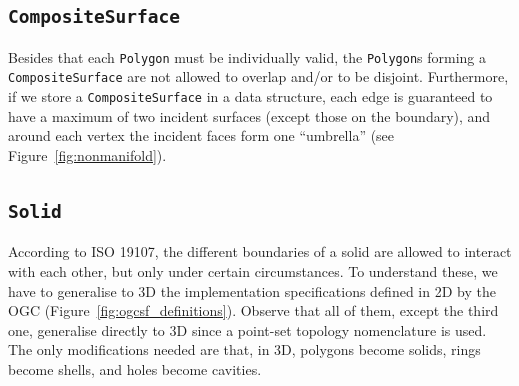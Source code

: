 \subsection{\texttt{CompositeSurface}}
Besides that each \texttt{Polygon} must be individually valid, the \texttt{Polygon}s forming a \texttt{Composite\-Surface} are not allowed to overlap and/or to be disjoint.
Furthermore, if we store a \texttt{Com\-po\-site\-Surface} in a data structure, each edge is guaranteed to have a maximum of two incident surfaces (except those on the boundary), and around each vertex the incident faces form one ``umbrella'' (see Figure~\ref{fig:nonmanifold}).


\subsection{\texttt{Solid}}

According to ISO 19107, the different boundaries of a solid are allowed to interact with each other, but only under certain circumstances.
To understand these, we have to generalise to 3D the implementation specifications defined in 2D by the OGC (Figure~\ref{fig:ogcsf_definitions}).
Observe that all of them, except the third one, generalise directly to 3D since a point-set topology nomenclature is used.
The only modifications needed are that, in 3D, polygons become solids, rings become shells, and holes become cavities.

